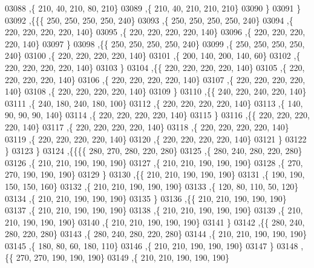 \begin{DoxyCode}
03088     ,\{   210,    40,   210,    80,   210\}
03089     ,\{   210,    40,   210,   210,   210\}
03090     \}
03091    \}
03092   ,\{\{\{   250,   250,   250,   250,   240\}
03093     ,\{   250,   250,   250,   250,   240\}
03094     ,\{   220,   220,   220,   220,   140\}
03095     ,\{   220,   220,   220,   220,   140\}
03096     ,\{   220,   220,   220,   220,   140\}
03097     \}
03098    ,\{\{   250,   250,   250,   250,   240\}
03099     ,\{   250,   250,   250,   250,   240\}
03100     ,\{   220,   220,   220,   220,   140\}
03101     ,\{   200,   140,   200,   140,    60\}
03102     ,\{   220,   220,   220,   220,   140\}
03103     \}
03104    ,\{\{   220,   220,   220,   220,   140\}
03105     ,\{   220,   220,   220,   220,   140\}
03106     ,\{   220,   220,   220,   220,   140\}
03107     ,\{   220,   220,   220,   220,   140\}
03108     ,\{   220,   220,   220,   220,   140\}
03109     \}
03110    ,\{\{   240,   220,   240,   220,   140\}
03111     ,\{   240,   180,   240,   180,   100\}
03112     ,\{   220,   220,   220,   220,   140\}
03113     ,\{   140,    90,    90,    90,   140\}
03114     ,\{   220,   220,   220,   220,   140\}
03115     \}
03116    ,\{\{   220,   220,   220,   220,   140\}
03117     ,\{   220,   220,   220,   220,   140\}
03118     ,\{   220,   220,   220,   220,   140\}
03119     ,\{   220,   220,   220,   220,   140\}
03120     ,\{   220,   220,   220,   220,   140\}
03121     \}
03122    \}
03123   \}
03124  ,\{\{\{\{   280,   270,   280,   220,   280\}
03125     ,\{   280,   240,   280,   220,   280\}
03126     ,\{   210,   210,   190,   190,   190\}
03127     ,\{   210,   210,   190,   190,   190\}
03128     ,\{   270,   270,   190,   190,   190\}
03129     \}
03130    ,\{\{   210,   210,   190,   190,   190\}
03131     ,\{   190,   190,   150,   150,   160\}
03132     ,\{   210,   210,   190,   190,   190\}
03133     ,\{   120,    80,   110,    50,   120\}
03134     ,\{   210,   210,   190,   190,   190\}
03135     \}
03136    ,\{\{   210,   210,   190,   190,   190\}
03137     ,\{   210,   210,   190,   190,   190\}
03138     ,\{   210,   210,   190,   190,   190\}
03139     ,\{   210,   210,   190,   190,   190\}
03140     ,\{   210,   210,   190,   190,   190\}
03141     \}
03142    ,\{\{   280,   240,   280,   220,   280\}
03143     ,\{   280,   240,   280,   220,   280\}
03144     ,\{   210,   210,   190,   190,   190\}
03145     ,\{   180,    80,    60,   180,   110\}
03146     ,\{   210,   210,   190,   190,   190\}
03147     \}
03148    ,\{\{   270,   270,   190,   190,   190\}
03149     ,\{   210,   210,   190,   190,   190\}

\end{DoxyCode}
